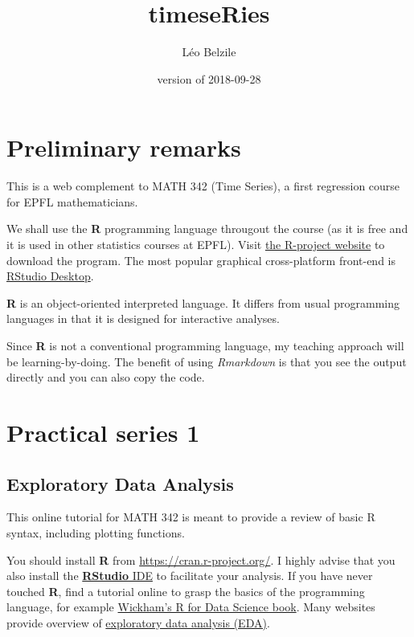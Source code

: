 \documentclass[]{book}
\title{timeseRies}
\author{Léo Belzile}
\date{version of 2018-09-28}
\begin{document}
\maketitle

{
\setcounter{tocdepth}{1}
\tableofcontents
}
\chapter*{Preliminary remarks}\label{preliminary-remarks}

This is a web complement to MATH 342 (Time Series), a first regression
course for EPFL mathematicians.

We shall use the \textbf{R} programming language througout the course
(as it is free and it is used in other statistics courses at EPFL).
Visit \href{https://cran.r-project.org/}{the R-project website} to
download the program. The most popular graphical cross-platform
front-end is
\href{https://www.rstudio.com/products/rstudio/download/}{RStudio
Desktop}.

\textbf{R} is an object-oriented interpreted language. It differs from
usual programming languages in that it is designed for interactive
analyses.

Since \textbf{R} is not a conventional programming language, my teaching
approach will be learning-by-doing. The benefit of using
\emph{Rmarkdown} is that you see the output directly and you can also
copy the code.

\chapter{Practical series 1}\label{practical-series-1}

\section{Exploratory Data Analysis}\label{exploratory-data-analysis}

This online tutorial for MATH 342 is meant to provide a review of basic
R syntax, including plotting functions.

You should install \textbf{R} from \url{https://cran.r-project.org/}. I
highly advise that you also install the
\href{http://rstudio.com}{\textbf{RStudio} IDE} to facilitate your
analysis. If you have never touched \textbf{R}, find a tutorial online
to grasp the basics of the programming language, for example
\href{http://r4ds.had.co.nz/}{Wickham's R for Data Science book}. Many
websites provide overview of
\href{http://r4ds.had.co.nz/exploratory-data-analysis.html}{exploratory
data analysis (EDA)}.
\end{document}
